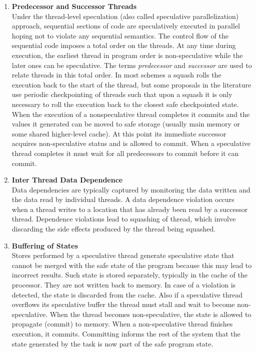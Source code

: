 \documentclass[10pt]{report}          %
\begin{document}
\begin{enumerate}
 
\item \textbf{Predecessor and Successor Threads} \\
Under the thread-level speculation (also called speculative parallelization) approach, sequential sections of code are speculatively executed in parallel hoping not to violate any sequential semantics.
The control flow of the sequential code imposes a total order on the threads. At any time during execution, the earliest thread in program order is non-speculative while the later ones can be speculative.
The terms \textit{predecessor} and \textit{successor} are used to relate threads in this total order.  In most schemes a squash rolls the execution back to the start of the thread, but some proposals in the literature use periodic checkpointing of threads such that upon a squash it is only necessary to roll the execution back to the closest safe checkpointed state. When the execution of a nonspeculative thread completes it commits and the values it generated can be moved to safe storage (usually main memory or some shared higher-level cache). At this point its immediate successor acquires non-speculative status and is allowed to commit. When a speculative thread completes it must wait for all predecessors to commit before it can commit.
\item \textbf{Inter Thread Data Dependence} \\
Data dependencies are typically captured by monitoring the data written and the data read by individual threads. A data dependence violation occurs when a thread writes to a location that has already been read by a successor thread. Dependence violations lead to squashing of thread, which involve discarding the side effects produced by the thread being squashed.
\item \textbf{Buffering of States} \\
Stores performed by a speculative thread generate speculative state that cannot be merged with the safe state of the program because this may lead to incorrect results. Such state is stored separately, typically in the cache of the processor. They are not written back to memory. In case of a violation is detected, the state is discarded from the cache. Also if a speculative thread overﬂows its speculative buffer the thread must stall and wait to become non-speculative. When the thread becomes non-speculative, the state is allowed to propagate (commit) to memory. When a non-speculative thread finishes execution, it commits. Committing informs the rest of the system that the state generated by the task is now part of the safe program state.

\end{enumerate}
\end{document}
